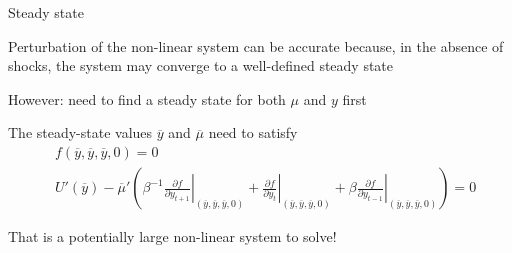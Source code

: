\documentclass[handout,usepdftitle=false,xcolor=dvipsnames,aspectratio=169]{beamer}
\begin{document}
\begin{frame}{Steady state}
  \begin{witemize}
    \item Perturbation of the non-linear system can be accurate because, in the absence of shocks, the system may converge to a well-defined steady state
    \item However: need to find a steady state for both $\mu$ and $y$ first
    \item The steady-state values $\overline{y}$ and $\overline{\mu}$ need to satisfy
    \begin{align}
       & f(\overline{y}, \overline{y}, \overline{y}, 0) = 0                                                                                                                                                                                                                                                                                                                                                                                     \\
       & U' \left(\overline{y} \right) - \overline{\mu} ' \left( \beta^{-1} \left. \frac{\partial f}{\partial y_{t+1}} \right|_{\left( \overline{y}, \overline{y}, \overline{y}, 0 \right)} + \left. \frac{\partial f}{\partial y_{t}} \right|_{\left( \overline{y}, \overline{y}, \overline{y}, 0 \right)} + \beta \left. \frac{\partial f}{\partial y_{t-1}} \right|_{\left( \overline{y}, \overline{y}, \overline{y}, 0 \right)} \right) = 0
    \end{align}
    \item That is a potentially large non-linear system to solve!
  \end{witemize}
\end{frame}
\end{document}

